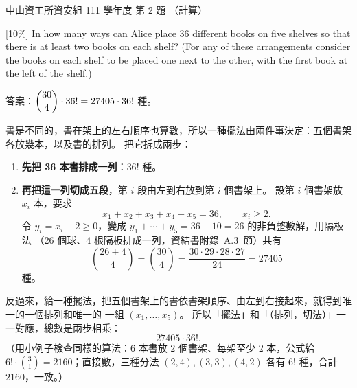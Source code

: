 \begin{pastexam}[label={px:nsysu-111-dmalg-01}]{中山資工所資安組 111 學年度 第 2 題}
（計算）

{[10\%]} In how many ways can Alice place 36 different books on five shelves so that there is at least
two books on each shelf? (For any of these arrangements consider the books on each shelf to be placed
one next to the other, with the first book at the left of the shelf.)
\end{pastexam}

\begin{pastsoln}
答案：$\dbinom{30}{4} \cdot 36! = 27405 \cdot 36!$ 種。

書是不同的，書在架上的左右順序也算數，所以一種擺法由兩件事決定：五個書架各放幾本，以及書的排列。
把它拆成兩步：
\begin{enumerate}
\item \textbf{先把 36 本書排成一列}：$36!$ 種。
\item \textbf{再把這一列切成五段}，第 $i$ 段由左到右放到第 $i$ 個書架上。 設第 $i$ 個書架放 $x_i$
本，要求
\[
x_1 + x_2 + x_3 + x_4 + x_5 = 36, \qquad x_i \ge 2 .
\]
令 $y_i = x_i - 2 \ge 0$，變成 $y_1 + \cdots + y_5 = 36 - 10 = 26$ 的非負整數解，用隔板法
（$26$ 個球、$4$ 根隔板排成一列，資結書附錄~A.3~節）共有
\[
\binom{26 + 4}{4} = \binom{30}{4} = \frac{30 \cdot 29 \cdot 28 \cdot 27}{24} = 27405
\]
種。
\end{enumerate}
反過來，給一種擺法，把五個書架上的書依書架順序、由左到右接起來，就得到唯一的一個排列和唯一的
一組 $(x_1, \ldots, x_5)$。 所以「擺法」和「（排列，切法）」一一對應，總數是兩步相乘：
\[
27405 \cdot 36! .
\]
（用小例子檢查同樣的算法：$6$ 本書放 $2$ 個書架、每架至少 $2$ 本，公式給 $6! \cdot \binom{3}{1}
= 2160$；直接數，三種分法 $(2,4), (3,3), (4,2)$ 各有 $6!$ 種，合計 $2160$，一致。）
\end{pastsoln}

